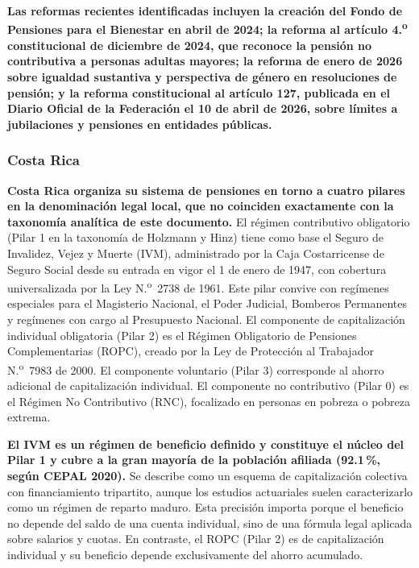 \documentclass[12pt, letterpaper]{article}
\begin{document}
\textbf{Las reformas recientes identificadas incluyen la creación del Fondo de Pensiones para el Bienestar en abril de 2024; la reforma al artículo 4.\textsuperscript{o} constitucional de diciembre de 2024, que reconoce la pensión no contributiva a personas adultas mayores; la reforma de enero de 2026 sobre igualdad sustantiva y perspectiva de género en resoluciones de pensión; y la reforma constitucional al artículo 127, publicada en el Diario Oficial de la Federación el 10 de abril de 2026, sobre límites a jubilaciones y pensiones en entidades públicas.}

\subsubsection{Costa Rica}

\textbf{Costa Rica organiza su sistema de pensiones en torno a cuatro pilares en la denominación legal local, que no coinciden exactamente con la taxonomía analítica de este documento.} El régimen contributivo obligatorio (Pilar 1 en la taxonomía de Holzmann y Hinz) tiene como base el Seguro de Invalidez, Vejez y Muerte (IVM), administrado por la Caja Costarricense de Seguro Social desde su entrada en vigor el 1 de enero de 1947, con cobertura universalizada por la Ley N.\textsuperscript{o}~2738 de 1961. Este pilar convive con regímenes especiales para el Magisterio Nacional, el Poder Judicial, Bomberos Permanentes y regímenes con cargo al Presupuesto Nacional. El componente de capitalización individual obligatoria (Pilar 2) es el Régimen Obligatorio de Pensiones Complementarias (ROPC), creado por la Ley de Protección al Trabajador N.\textsuperscript{o}~7983 de 2000. El componente voluntario (Pilar 3) corresponde al ahorro adicional de capitalización individual. El componente no contributivo (Pilar 0) es el Régimen No Contributivo (RNC), focalizado en personas en pobreza o pobreza extrema.

\textbf{El IVM es un régimen de beneficio definido y constituye el núcleo del Pilar 1 y cubre a la gran mayoría de la población afiliada (92.1\,\%, según CEPAL 2020).} Se describe como un esquema de capitalización colectiva con financiamiento tripartito, aunque los estudios actuariales suelen caracterizarlo como un régimen de reparto maduro. Esta precisión importa porque el beneficio no depende del saldo de una cuenta individual, sino de una fórmula legal aplicada sobre salarios y cuotas. En contraste, el ROPC (Pilar 2) es de capitalización individual y su beneficio depende exclusivamente del ahorro acumulado.
\end{document}

